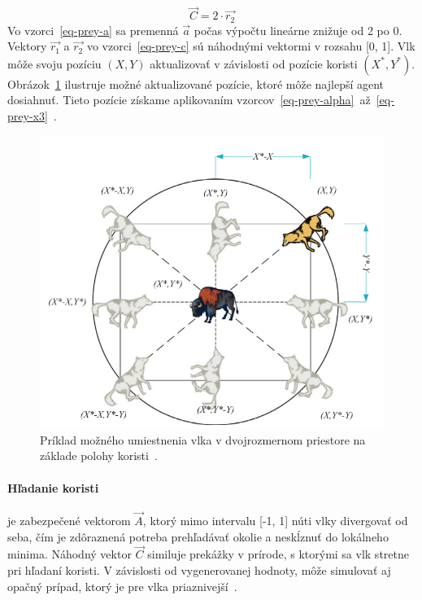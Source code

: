 \documentclass[a4paper,slovak,12pt,appendix]{article}
\begin{document}
\begin{equation}
  \vec{C} = 2 \cdot \vec{r_2}
  \label{eq-prey-c}
\end{equation}
Vo vzorci~\ref{eq-prey-a} sa premenná $\vec{a}$ počas výpočtu lineárne
znižuje od 2 po 0. Vektory $\vec{r_1}$ a $\vec{r_2}$ vo vzorci~\ref{eq-prey-c}
sú náhodnými vektormi v rozsahu [0, 1]. Vlk môže svoju pozíciu $(X, Y)$
aktualizovať v závislosti od pozície koristi $(X^*, Y^*)$.
Obrázok~\ref{fig-wolf-pos} ilustruje možné aktualizované pozície, ktoré môže
najlepší agent dosiahnuť. Tieto pozície získame aplikovaním
vzorcov~\ref{eq-prey-alpha}~až~\ref{eq-prey-x3}~\cite{Seeley1991}.

\begin{figure}[ht]
  \centering
  \includegraphics[width=\textwidth]{wolf_vector_positions.png}
  \caption{Príklad možného umiestnenia vlka v dvojrozmernom priestore na základe polohy koristi~\cite{Seeley1991}.}
  \label{fig-wolf-pos}
\end{figure}

\paragraph{Hľadanie koristi} je zabezpečené vektorom $\vec{A}$, ktorý mimo
intervalu [-1, 1] núti vlky divergovať od seba, čím je zdôraznená potreba
prehľadávať okolie a neskĺznuť do lokálneho minima. Náhodný vektor $\vec{C}$
similuje prekážky v prírode, s ktorými sa vlk stretne pri hľadaní koristi.
V závislosti od vygenerovanej hodnoty, môže simulovať aj opačný prípad, ktorý
je pre vlka priaznivejší~\cite{Seeley1991}.
\end{document}
